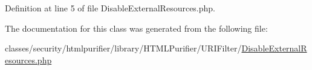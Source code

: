 Definition at line 5 of file Disable\+External\+Resources.\+php.



The documentation for this class was generated from the following file\+:\begin{DoxyCompactItemize}
\item 
classes/security/htmlpurifier/library/\+H\+T\+M\+L\+Purifier/\+U\+R\+I\+Filter/\hyperlink{DisableExternalResources_8php}{Disable\+External\+Resources.\+php}\end{DoxyCompactItemize}
